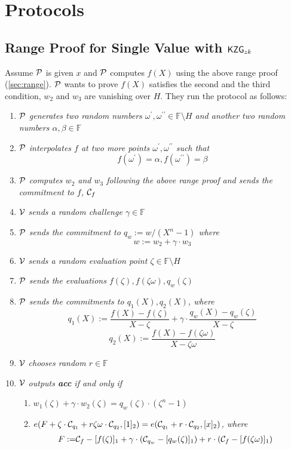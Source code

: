 
\chapter{Protocols}

\section{Range Proof for Single Value with $\mathsf{KZG}_{zk}$}
\label{sec:rpzk}
Assume $\mathcal{P}$ is given $x$ and $\mathcal{P}$ computes $f(X)$ using the above range proof (\ref{sec:range}). $\mathcal{P}$ wants to prove $f(X)$ satisfies the second and the third condition, \ie $w_2$ and $w_3$ are vanishing over $H$. They run the protocol as follows:
\begin{enumerate}
    \item $\mathcal{P}$ \textit{generates two random numbers $\omega^{\prime},\omega^{\prime\prime}\in\mathbb{F}\setminus{H}$ and another two random numbers $\alpha,\beta\in\mathbb{F}$}
    \item $\mathcal{P}$ \textit{interpolates $f$ at two more points ${\omega^{\prime},\omega^{\prime\prime}}$ such that}
    \[ f(\omega^{\prime})=\alpha,f(\omega^{\prime\prime})=\beta \]
    \item $\mathcal{P}$ \textit{computes $w_2$ and $w_3$ following the above range proof and sends the commitment to $f$,} $\mathcal{C}_f$
    \item $\mathcal{V}$ \textit{sends a random challenge $\gamma\in\mathbb{F}$}
    \item $\mathcal{P}$ \textit{sends the commitment to $q_w:=w/(X^n-1)$ where}
    \[ w:=w_2+\gamma\cdot{w_3} \]
    \item $\mathcal{V}$ \textit{sends a random evaluation point $\zeta\in\mathbb{F}\setminus{H}$}
    \item $\mathcal{P}$ \textit{sends the evaluations $f(\zeta),f(\zeta\omega),q_w(\zeta)$}
    \item $\mathcal{P}$ \textit{sends the commitments to $q_1(X),q_2(X)$, where}
    \[ q_1(X):=\frac{f(X)-f(\zeta)}{X-\zeta}+\gamma\cdot\frac{q_w(X)-q_w(\zeta)}{X-\zeta} \]
    \[ q_2(X):=\frac{f(X)-f(\zeta\omega)}{X-\zeta\omega} \]
    \item $\mathcal{V}$ \textit{chooses random $r\in\mathbb{F}$}
    \item $\mathcal{V}$ \textit{outputs \textbf{acc} if and only if}
    \begin{enumerate}
    	\item $w_1(\zeta)+\gamma\cdot{w_2(\zeta)}=q_w(\zeta)\cdot(\zeta^n-1)$
    	\item $e(F+\zeta\cdot\mathcal{C}_{q_1}+r\zeta\omega\cdot\mathcal{C}_{q_2},[1]_2)=e(\mathcal{C}_{q_1}+r\cdot\mathcal{C}_{q_2},[x]_2)$\textit{, where}
    	\begin{align*}
    		F:=&\mathcal{C}_f-[f(\zeta)]_1+\gamma\cdot(\mathcal{C}_{q_w}-[q_w(\zeta)]_1)+r\cdot(\mathcal{C}_f-[f(\zeta\omega)]_1)
    	\end{align*}
    \end{enumerate}
\end{enumerate}

